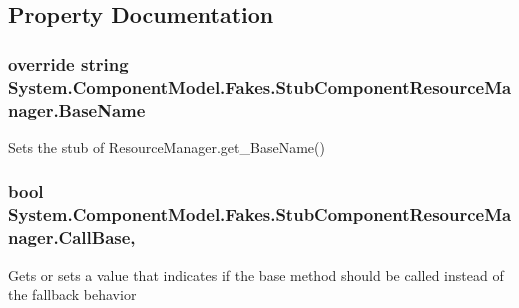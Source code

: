 \subsection{Property Documentation}
\hypertarget{class_system_1_1_component_model_1_1_fakes_1_1_stub_component_resource_manager_added07d6f0ee8844f6455286de79dde2}{
\subsubsection[{Base\-Name}]{\setlength{\rightskip}{0pt plus 5cm}override string System.\-Component\-Model.\-Fakes.\-Stub\-Component\-Resource\-Manager.\-Base\-Name\hspace{0.3cm}{\ttfamily [get]}}}\label{class_system_1_1_component_model_1_1_fakes_1_1_stub_component_resource_manager_added07d6f0ee8844f6455286de79dde2}


Sets the stub of Resource\-Manager.\-get\-\_\-\-Base\-Name()

\hypertarget{class_system_1_1_component_model_1_1_fakes_1_1_stub_component_resource_manager_a0ecdd9fbbef58b4133c92ef46ca318d2}{
\subsubsection[{Call\-Base}]{\setlength{\rightskip}{0pt plus 5cm}bool System.\-Component\-Model.\-Fakes.\-Stub\-Component\-Resource\-Manager.\-Call\-Base\hspace{0.3cm}{\ttfamily [get]}, {\ttfamily [set]}}}\label{class_system_1_1_component_model_1_1_fakes_1_1_stub_component_resource_manager_a0ecdd9fbbef58b4133c92ef46ca318d2}


Gets or sets a value that indicates if the base method should be called instead of the fallback behavior

